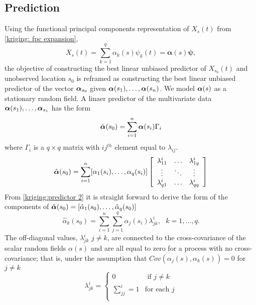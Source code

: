 \subsection{Prediction} 

\label{sec:functional_kriging_predictor}

Using the functional principal components representation of $X_s(t)$ from \eqref{kriging: fpc expansion},
\begin{equation}
	X_{s}(t) = \sum_{k=1}^{q} \alpha_k(s)\psi_k(t) = \boldsymbol{\alpha}(s)\boldsymbol{\psi}, 
\end{equation}
the objective of constructing the best linear unbiased predictor of $X_{s_0}(t)$ and unobserved location $s_0$ is reframed as constructing the best linear unbiased predictor of the vector $\boldsymbol\alpha_{s_0}$ given $\boldsymbol\alpha(s_1), \dots, \boldsymbol\alpha(s_n)$. We model $\boldsymbol\alpha(s)$ as a stationary random field. A linaer predictor of the multivariate data $\boldsymbol\alpha(s_1), \dots, \boldsymbol\alpha_{s_1}$ has the form
\begin{equation}
	\hat{\boldsymbol\alpha}(s_0) = \sum_{i=1}^n \boldsymbol\alpha(s_i)\Gamma_i \label{kriging:predictor}
\end{equation}
where $\Gamma_i$ is a $q \times q$ matrix with $ij^{th}$ element equal to $\lambda_{ij}$. 
\begin{equation}\label{kriging:predictor 2}
		\hat{\boldsymbol\alpha}(s_0) = \sum_{i=1}^n [\alpha_1(s_i), \dots, \alpha_q(s_i)] 
		\left[ 
			\begin{array}{ccc}
				\lambda^i_{11} & \dots & \lambda^i_{1q}\\
				\vdots & \ddots & \vdots \\
				\lambda^i_{q1} & \dots & \lambda^i_{qq}
			\end{array}
		\right]
\end{equation}
From \eqref{kriging:predictor 2} it is straight forward to derive the form of the components of $\hat{\boldsymbol\alpha}(s_0)=[\hat{\alpha}_1(s_0), \dots, \hat{\alpha}_q(s_0)]$
\begin{equation}
	\hat{\alpha}_k(s_0) = \sum_{i=1}^n\sum_{j=1}^q\alpha_j(s_i)\lambda^i_{jk}, \mbox{ } k = 1, \dots, q.
\end{equation}
The off-diagonal values, $\lambda^i_{jk}$ $j \neq k$, are connected to the cross-covariance of the scalar random fields $\alpha(s)$ and are all equal to zero for a process with no cross-covariance; that is, under the assumption that $Cov(\alpha_j(s), \alpha_k(s)) = 0$ for $j \neq k$
\begin{equation}
	\lambda^i_{jk} = \begin{cases}
														0 & \text{ if } j \neq k\\
														\sum_{jj}^i = 1 & \text{for each $j$}\\
 										\end{cases}
\end{equation}

